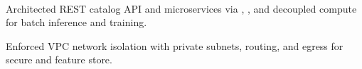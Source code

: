\documentclass{tex/deedy-resume-openfont}
\begin{document}
\begin{minipage}[t]{0.67\textwidth}
\\
\begin{tightemize}
    \item Architected REST catalog API and microservices via , , and decoupled compute for batch inference and training.
    \item Enforced VPC network isolation with private subnets,  routing, and  egress for secure  and feature store.
\end{tightemize}

\end{minipage} 
\end{document}
